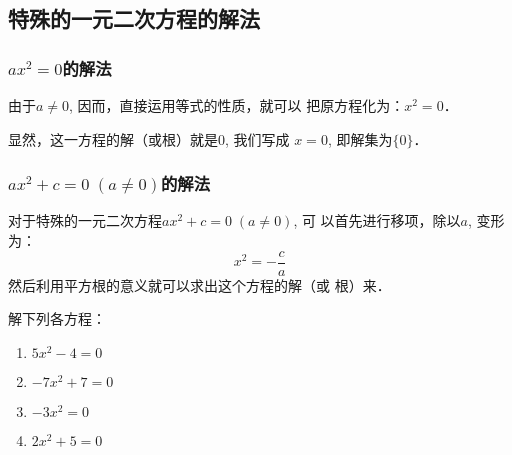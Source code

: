 \subsection{特殊的一元二次方程的解法}
\subsubsection{$ax^2=0$的解法}
由于$a\ne 0$, 因而，直接运用等式的性质，就可以
把原方程化为：$x^2=0$．

显然，这一方程的解（或根）就是0, 我们写成
$x=0$, 即解集为$\{0\}$．

\subsubsection{$ax^2+c=0\; (a\ne 0)$的解法}

对于特殊的一元二次方程$ax^2+c=0\; (a\ne 0)$, 可
以首先进行移项，除以$a$, 变形为：
\[x^2=-\frac{c}{a}\]
然后利用平方根的意义就可以求出这个方程的解（或
根）来．

\begin{example}
    解下列各方程：
\begin{multicols}{2}
\begin{enumerate}
    \item $5x^2-4=0$
    \item $-7x^2+7=0$
    \item $-3x^2=0$
    \item $2x^2+5=0$
\end{enumerate}
\end{multicols}
\end{example}

